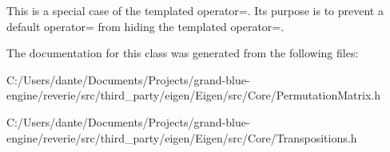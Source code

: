 This is a special case of the templated operator=. Its purpose is to prevent a default operator= from hiding the templated operator=. 

The documentation for this class was generated from the following files\+:\begin{DoxyCompactItemize}
\item 
C\+:/\+Users/dante/\+Documents/\+Projects/grand-\/blue-\/engine/reverie/src/third\+\_\+party/eigen/\+Eigen/src/\+Core/Permutation\+Matrix.\+h\item 
C\+:/\+Users/dante/\+Documents/\+Projects/grand-\/blue-\/engine/reverie/src/third\+\_\+party/eigen/\+Eigen/src/\+Core/Transpositions.\+h\end{DoxyCompactItemize}
